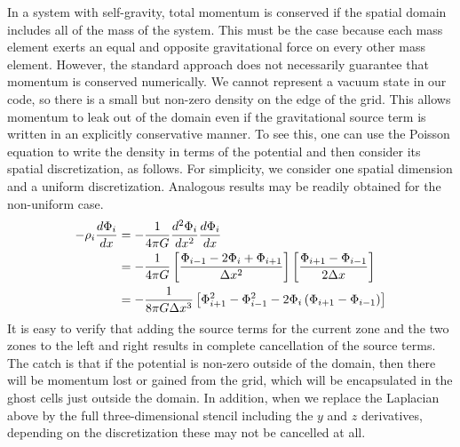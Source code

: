 \documentclass[12pt]{article}
\begin{document}
In a system with self-gravity, total momentum is conserved if the spatial domain
includes all of the mass of the system. This must be the
case because each mass element exerts an equal and opposite gravitational force
on every other mass element. However, the standard approach does not necessarily
guarantee that momentum is conserved numerically. We cannot represent a vacuum state
in our code, so there is a small but non-zero density on the edge of the grid.
This allows momentum to leak out of the domain even if the gravitational source term
is written in an explicitly conservative manner. To see this, one can use the Poisson equation to write the
density in terms of the potential and then consider its spatial discretization, as follows. For simplicity,
we consider one spatial dimension and a uniform discretization. Analogous results
may be readily obtained for the non-uniform case.
\begin{align}
  -\rho_{i}  \frac{d\Phi_{i}}{dx} &= -\frac{1}{4\pi G} \frac{d^2\Phi_i}{dx^2} \frac{d \Phi_i}{dx} \notag \\
  &= -\frac{1}{4\pi G} \left[\frac{\Phi_{i-1} - 2 \Phi_{i} + \Phi_{i+1}}{\Delta x^2}\right] \left[ \frac{\Phi_{i+1} - \Phi_{i-1}}{2\Delta x} \right] \notag \\
  &= -\frac{1}{8\pi G \Delta x^3} \left[ \Phi_{i+1}^2 - \Phi_{i-1}^2 - 2\Phi_i\left(\Phi_{i+1} - \Phi_{i-1}\right) \right] \label{eq:momentum_discretization}
\end{align}
It is easy to verify that adding the source terms for the current zone and the two zones
to the left and right results in complete cancellation of the source terms.
The catch is that if the potential is non-zero outside of the domain, then there will be
momentum lost or gained from the grid, which will be encapsulated in the ghost cells
just outside the domain. In addition, when we replace the Laplacian above by the full
three-dimensional stencil including the $y$ and $z$ derivatives, depending on the
discretization these may not be cancelled at all.
\end{document}
